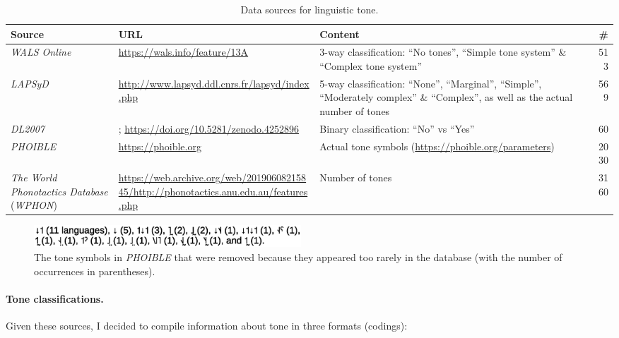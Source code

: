 \documentclass[twoside,twocolumn]{article}
\begin{document}
\begin{table}[h]
  \caption{Data sources for linguistic tone.}
  \label{Tab:tone_data_surces}
  \centering
  \begin{tabularx}{\textwidth}{|X|X|X|r|}
    \toprule
    \textbf{Source} & \textbf{URL} & \textbf{Content} & \textbf{\#} \\
    \midrule
    \textit{WALS Online} \citep{dryer_wals_2013} & \url{https://wals.info/feature/13A} & 3-way classification: ``No tones'', ``Simple tone system'' \& ``Complex tone system''  & 513 \\
    \textit{LAPSyD} & \url{http://www.lapsyd.ddl.cnrs.fr/lapsyd/index.php} & 5-way classification: ``None'', ``Marginal'', ``Simple'', ``Moderately complex'' \& ``Complex'', as well as the actual number of tones  & 569 \\
    \textit{DL2007} \citep{dediu_ladd_2007} & \citet[Annex 6, p. 373--386]{dediu_phd_2007}; \url{https://doi.org/10.5281/zenodo.4252896} & Binary classification: ``No'' vs ``Yes''  & 60 \\
    \textit{PHOIBLE} \citep{moran_phoible_2014} & \url{https://phoible.org} & Actual tone symbols (\url{https://phoible.org/parameters})  & 2030 \\
    \textit{The World Phonotactics Database} (\textit{WPHON}) \citep{donohue_world_2013} & \url{https://web.archive.org/web/20190608215845/http://phonotactics.anu.edu.au/features.php} & Number of tones  & 3160 \\
    \bottomrule
  \end{tabularx}
\end{table}

\begin{figure}[h]
  \centering
  \includegraphics[width=10cm]{phoible_rare_tone_symbols}
  \caption{The tone symbols in \textit{PHOIBLE} that were removed because they appeared too rarely in the database (with the number of occurrences in parentheses).}
  \label{Fig:rare_phoible_tone_symbols}
\end{figure}


\paragraph{Tone classifications.}

Given these sources, I decided to compile information about tone in three formats (codings):
\end{document}
